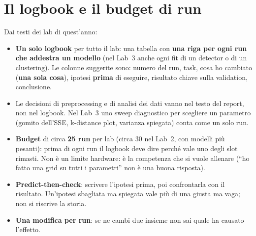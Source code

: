 \section{Il logbook e il budget di run}
Dai testi dei lab di quest'anno:
\begin{itemize}
  \item \textbf{Un solo logbook} per tutto il lab: una tabella con \textbf{una riga per ogni run che
        addestra un modello} (nel Lab~3 anche ogni fit di un detector o di un clustering). Le colonne
        suggerite sono: numero del run, task, cosa ho cambiato (\textbf{una sola cosa}), ipotesi
        \textbf{prima} di eseguire, risultato chiave sulla validation, conclusione.
  \item Le decisioni di preprocessing e di analisi dei dati vanno nel testo del report, non nel logbook.
        Nel Lab~3 uno sweep diagnostico per scegliere un parametro (gomito dell'SSE, k-distance plot,
        varianza spiegata) conta come un solo run.
  \item \textbf{Budget} di circa \textbf{25 run} per lab (circa 30 nel Lab~2, con modelli più pesanti): prima di ogni run il logbook deve dire perché
        vale uno degli slot rimasti. Non è un limite hardware: è la competenza che si vuole allenare
        (``ho fatto una grid su tutti i parametri'' non è una buona risposta).
  \item \textbf{Predict-then-check}: scrivere l'ipotesi prima, poi confrontarla con il risultato.
        Un'ipotesi sbagliata ma spiegata vale più di una giusta ma vaga; non si riscrive la storia.
  \item \textbf{Una modifica per run}: se ne cambi due insieme non sai quale ha causato l'effetto.
\end{itemize}

